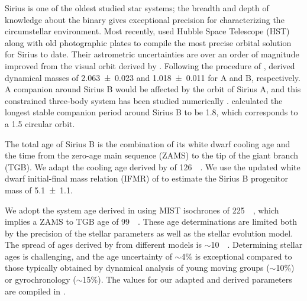 \documentclass[twocolumn]{aastex631}
\begin{document}
Sirius is one of the oldest studied star systems; the breadth and depth of knowledge about the binary gives exceptional precision for characterizing the circumstellar environment. Most recently, \citet{bondSiriusSystemIts2017} used Hubble Space Telescope (HST) along with old photographic plates to compile the most precise orbital solution for Sirius to date. Their astrometric uncertainties are over an order of magnitude improved from the visual orbit derived by \citet{vandenbosOrbitSiriusADS1960}. Following the procedure of \citet{gatewoodStudySirius1978}, \citet{bondSiriusSystemIts2017} derived dynamical masses of \qty{2.063+-0.023}{\solarmass} and \qty{1.018+-0.011}{\solarmass} for A and B, respectively. A companion around Sirius B would be affected by the orbit of Sirius A, and this constrained three-body system has been studied numerically \citep{holmanLongTermStabilityPlanets1999}. \citet{bondSiriusSystemIts2017} calculated the longest stable companion period around Sirius B to be \qty{1.8}{\year}, which corresponds to a \qty{1.5}{\au} circular orbit.

The total age of Sirius B is the combination of its white dwarf cooling age and the time from the zero-age main sequence (ZAMS) to the tip of the giant branch (TGB). We adapt the cooling age derived by \citet[Sec.~8]{bondSiriusSystemIts2017} of \qty{126}{\mega\year}. We use the updated white dwarf initial-final mass relation (IFMR) of \citet{cummingsWhiteDwarfInitialFinal2018} to estimate the Sirius B progenitor mass of \qty{5.1\pm1.1}{\solarmass}.

We adopt the system age derived in \citet{cummingsWhiteDwarfInitialFinal2018} using MIST isochrones of \qty{225}{\mega\year}, which implies a ZAMS to TGB age of \qty{99}{\mega\year}. These age determinations are limited both by the precision of the stellar parameters as well as the stellar evolution model. The spread of ages derived by \citet{cummingsWhiteDwarfInitialFinal2018} from different models is $\sim$\qty{10}{\mega\year}. Determining stellar ages is challenging, and the age uncertainty of $\sim$4\% is exceptional compared to those typically obtained by dynamical analysis of young moving groups ($\sim$10\%) or gyrochronology ($\sim$15\%). The values for our adapted and derived parameters are compiled in .
\end{document}

